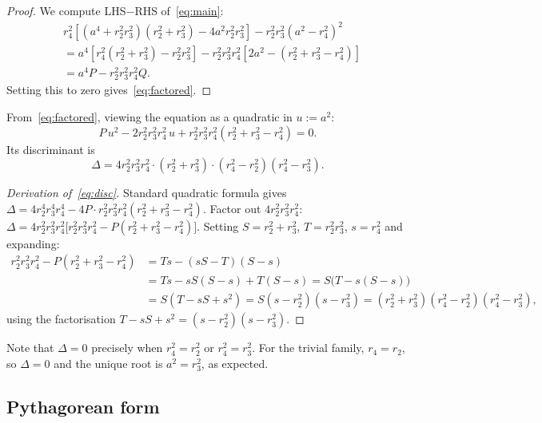 \documentclass[12pt, a4paper]{article}
\theoremstyle{definition}
\begin{document}
\begin{proof}
  We compute LHS$-$RHS of~\eqref{eq:main}:
  \begin{align*}
    &r_4^2\!\left[(a^4+r_2^2r_3^2)(r_2^2+r_3^2)-4a^2r_2^2r_3^2\right]
      - r_2^2r_3^2(a^2-r_4^2)^2\\
    &= a^4\!\left[r_4^2(r_2^2+r_3^2)-r_2^2r_3^2\right]
      - r_2^2r_3^2r_4^2\!\left[2a^2-(r_2^2+r_3^2-r_4^2)\right]\\
    &= a^4 P - r_2^2r_3^2r_4^2 Q.
  \end{align*}
  Setting this to zero gives~\eqref{eq:factored}.
\end{proof}

\noindent From~\eqref{eq:factored}, viewing the equation as a quadratic in
$u := a^2$:
\begin{equation}\label{eq:quad}
  P\,u^2 - 2r_2^2r_3^2r_4^2\,u + r_2^2r_3^2r_4^2(r_2^2+r_3^2-r_4^2) = 0.
\end{equation}
Its discriminant is
\begin{equation}\label{eq:disc}
  \Delta = 4r_2^2r_3^2r_4^2\cdot(r_2^2+r_3^2)\cdot(r_4^2-r_2^2)(r_4^2-r_3^2).
\end{equation}

\begin{proof}[Derivation of~\eqref{eq:disc}]
  Standard quadratic formula gives
  $\Delta = 4r_2^4r_3^4r_4^4 - 4P\cdot r_2^2r_3^2r_4^2(r_2^2+r_3^2-r_4^2)$.
  Factor out $4r_2^2r_3^2r_4^2$:
  $\Delta = 4r_2^2r_3^2r_4^2\bigl[r_2^2r_3^2r_4^2 - P(r_2^2+r_3^2-r_4^2)\bigr]$.
  Setting $S=r_2^2+r_3^2$, $T=r_2^2r_3^2$, $s=r_4^2$ and expanding:
  \begin{align*}
    r_2^2r_3^2r_4^2 - P(r_2^2+r_3^2-r_4^2)
    &= Ts - (sS-T)(S-s)\\
    &= Ts - sS(S-s) + T(S-s)
     = S\bigl(T - s(S-s)\bigr)\\
    &= S(T - sS + s^2)
     = S(s-r_2^2)(s-r_3^2)
     = (r_2^2+r_3^2)(r_4^2-r_2^2)(r_4^2-r_3^2),
  \end{align*}
  using the factorisation $T - sS + s^2 = (s-r_2^2)(s-r_3^2)$.
\end{proof}

\noindent Note that $\Delta = 0$ precisely when $r_4^2 = r_2^2$ or $r_4^2 = r_3^2$.  For
the trivial family, $r_4 = r_2$, so $\Delta = 0$ and the unique root is $a^2 = r_3^2$, as expected.

\subsection{Pythagorean form}
\end{document}
